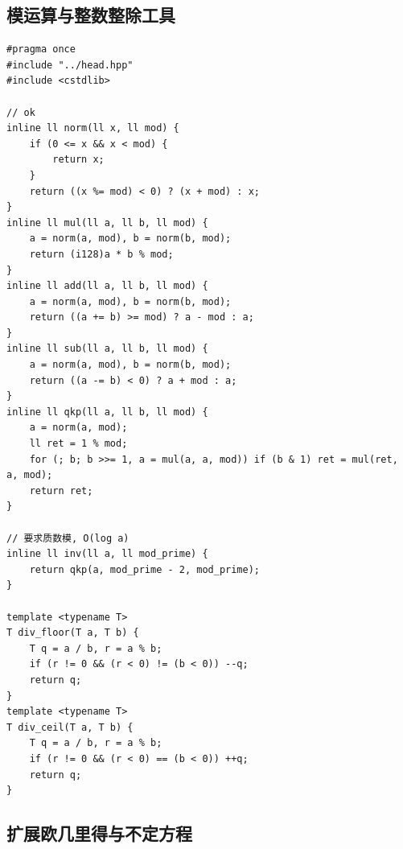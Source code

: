 \subsection{模运算与整数整除工具}
\par

\begin{lstlisting}
#pragma once
#include "../head.hpp"
#include <cstdlib>

// ok
inline ll norm(ll x, ll mod) { 
    if (0 <= x && x < mod) {
        return x;
    }
    return ((x %= mod) < 0) ? (x + mod) : x; 
}
inline ll mul(ll a, ll b, ll mod) { 
    a = norm(a, mod), b = norm(b, mod);
    return (i128)a * b % mod;
}
inline ll add(ll a, ll b, ll mod) {
    a = norm(a, mod), b = norm(b, mod);
    return ((a += b) >= mod) ? a - mod : a;
}
inline ll sub(ll a, ll b, ll mod) {
    a = norm(a, mod), b = norm(b, mod);
    return ((a -= b) < 0) ? a + mod : a;
}
inline ll qkp(ll a, ll b, ll mod) {
    a = norm(a, mod);
    ll ret = 1 % mod;
    for (; b; b >>= 1, a = mul(a, a, mod)) if (b & 1) ret = mul(ret, a, mod); 
    return ret;
}

// 要求质数模, O(log a)
inline ll inv(ll a, ll mod_prime) { 
    return qkp(a, mod_prime - 2, mod_prime); 
}

template <typename T>
T div_floor(T a, T b) {
    T q = a / b, r = a % b;
    if (r != 0 && (r < 0) != (b < 0)) --q;
    return q;
}
template <typename T>
T div_ceil(T a, T b) {
    T q = a / b, r = a % b;
    if (r != 0 && (r < 0) == (b < 0)) ++q;
    return q;
}
\end{lstlisting}

\subsection{扩展欧几里得与不定方程}
\par


